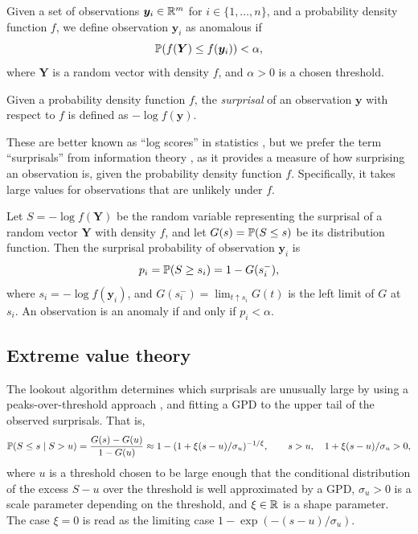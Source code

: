 \begin{defn}[Anomalies]
  Given a set of observations $\bm{y}_{i} \in \R^m$ for $i \in \{1, \dots, n\}$, and a probability density function $f$, we define observation $\bm{y}_i$ as anomalous if
  \begin{equation}
    \P(f(\bm{Y}) \le f(\bm{y}_{i})) < \alpha,
  \end{equation}
  where $\bm{Y}$ is a random vector with density $f$, and $\alpha>0$ is a chosen threshold.
\end{defn}

\begin{defn}[Surprisals]
  Given a probability density function $f$, the \emph{surprisal} of an observation $\bm{y}$ with respect to $f$ is defined as $-\log f(\bm{y})$.
\end{defn}
These are better known as  ``log scores'' in statistics \citep{Good1952-zw}, but we prefer the term ``surprisals'' from information theory \citep{Stone2022}, as it provides a measure of how surprising an observation is, given the probability density function $f$. Specifically, it takes large values for observations that are unlikely under $f$.

Let $S = -\log f(\bm{Y})$ be the random variable representing the surprisal of a random vector $\bm{Y}$ with density $f$, and let $G(s) = \P(S\le s)$ be its distribution function. Then the surprisal probability of observation $\bm{y}_i$ is
$$p_i = \P(S \ge s_i) = 1 - G(s_i^-),$$
where $s_i = -\log f (\bm{y}_i)$, and $G(s_i^-) = \lim_{t \uparrow s_i} G(t)$ is the left limit of $G$ at $s_i$. An observation is an anomaly if and only if $p_i < \alpha$.

\subsection{Extreme value theory}

The lookout algorithm determines which surprisals are unusually large by using a peaks-over-threshold approach \citep{Pickands1975,coles2001introduction}, and fitting a GPD to the upper tail of the observed surprisals. That is,
\begin{equation}\label{eq:POT4}
  \P(S \le s \mid S > u) = \frac{G(s) - G(u)}{1 - G(u)}
  \approx 1 - (1 + \xi (s-u)/\sigma_u)^{-1/\xi}, \qquad s > u, \quad 1 + \xi (s-u)/\sigma_u > 0,
\end{equation}
where $u$ is a threshold chosen to be large enough that the conditional distribution of the excess $S-u$ over the threshold is well approximated by a GPD, $\sigma_u > 0$ is a scale parameter depending on the threshold, and $\xi \in \R$ is a shape parameter. The case $\xi = 0$ is read as the limiting case $1 - \exp(-(s-u)/\sigma_u)$.


